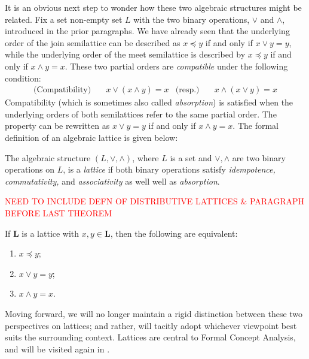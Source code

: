 It is an obvious next step to wonder how these two algebraic structures might be related. Fix a set non-empty set $L$
with the two binary operations, $\vee$ and $\wedge$, introduced in the prior paragraphs. We have already seen that the underlying
order of the join semilattice can be described as $x \preceq y$ if and only if $x \vee y = y$, while the underlying
order of the meet semilattice is described by $x \preceq y$ if and only if $x \wedge y = x$. These two partial orders are
\textit{compatible} under the following condition:
\begin{align}
	\text{(Compatibility)} & \quad x \vee (x \wedge y) = x & \text{(resp.)} & \quad x \wedge (x \vee y) = x
\end{align}
%
Compatibility (which is sometimes also called \textit{absorption}) is satisfied when the underlying orders of both
semilattices refer to the same partial order. The property can be rewritten as $x \vee y = y$ if and only if $x \wedge y
= x$. The formal definition of an algebraic lattice is given below:

\begin{definition}
	\label{definition:algebraic-lattice} The algebraic structure $(L, \vee, \wedge )$, where $L$ is a set and
	$\vee, \wedge$ are two binary operations on $L$, is a \emph{lattice} if both binary operations satisfy \textit{idempotence,
	commutativity,} and \textit{associativity} as well well as \textit{absorption}.
\end{definition}

\textcolor{red}{NEED TO INCLUDE DEFN OF DISTRIBUTIVE LATTICES \& PARAGRAPH BEFORE LAST THEOREM}

\begin{lemma}
	\label{lemma:the-connecting-lemma} If $\mathbf{L}$ is a lattice with $x, y \in \mathbf{L}$, then the following are
	equivalent:
	\begin{enumerate}
		\setlength{\itemsep}{0pt}
		\setlength{\parsep}{0pt}

		\item $x \preceq y$;

		\item $x \vee y = y$;

		\item $x \wedge y = x$.
	\end{enumerate}
\end{lemma}

Moving forward, we will no longer maintain a rigid distinction between these two perspectives on lattices; and rather, will
tacitly adopt whichever viewpoint best suits the surrounding context. Lattices are central to Formal Concept Analysis, and
will be visited again in .

